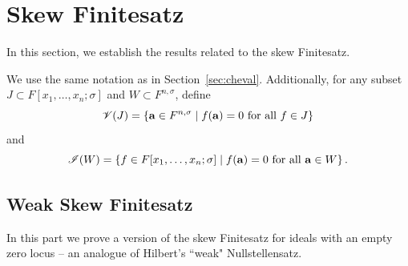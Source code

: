 \documentclass[11pt,reqno]{amsart}
\theoremstyle{definition}
\begin{document}
\section{Skew Finitesatz}\label{sec:skewfinitesatz}

In this section, we establish the results related to the skew Finitesatz.

We use the same notation as in Section~\ref{sec:cheval}. Additionally, for any subset $J\subset F[x_1,\dots,x_n;\sigma]$ and $W \subset F^{n,\sigma}$, define
$$
\mathscr{V}(J)=\left\lbrace {\bf a} \in F^{n,\sigma} \mid f({\bf a})=0\,\,\textrm{for all}\,\, f \in J \right\rbrace
$$ and
$$
\mathscr{I}(W)=\left\lbrace f \in F[x_1,\dots,x_n;\sigma] \mid f({\bf a})=0\,\,\textrm{for all}\,\, {\bf a} \in W \right\rbrace.
$$
\subsection{Weak Skew Finitesatz}

In this part we prove a version of the skew Finitesatz for ideals with an empty zero locus -- an analogue of Hilbert's ``weak" Nullstellensatz. 
\end{document}
